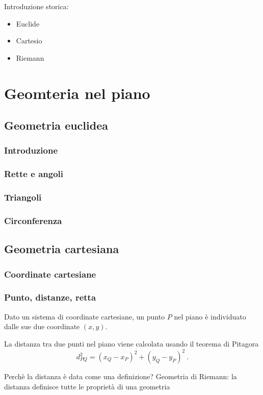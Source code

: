 
Introduzione storica:
\begin{itemize}
  \item Euclide
  \item Cartesio
  \item Riemann
\end{itemize}

\chapter{Geomteria nel piano}
\section{Geometria euclidea}
\subsection{Introduzione}
\subsection{Rette e angoli}
\subsection{Triangoli}
\subsection{Circonferenza}

\section{Geometria cartesiana}
\subsection{Coordinate cartesiane}
\subsection{Punto, distanze, retta}
\begin{definition}[Punto]
Dato un sistema di coordinate cartesiane, un punto $P$ nel piano è individuato dalle sue due coordinate $(x,y)$.
\end{definition}
\begin{definition}
La distanza tra due punti nel piano viene calcolata usando il teorema di Pitagora
\begin{equation}
    d_{PQ}^2 = (x_Q - x_P)^2 + (y_Q - y_P)^2 \ .
\end{equation}
\end{definition}
{\color{red} Perchè la distanza è data come una definizione? Geometria di Riemann: la distanza definisce tutte le proprietà di una geometria}

